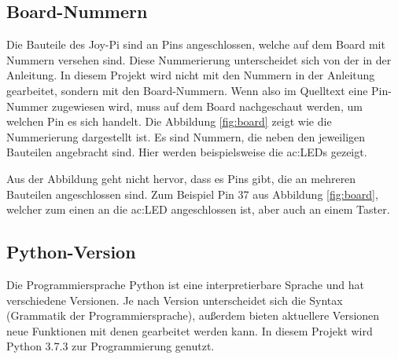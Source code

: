 \subsection{Board-Nummern}
Die Bauteile des Joy-Pi sind an Pins angeschlossen, welche auf dem Board mit Nummern versehen sind. Diese Nummerierung unterscheidet sich von der in der Anleitung. In diesem Projekt wird nicht mit den Nummern in der Anleitung gearbeitet, sondern mit den Board-Nummern. Wenn also im Quelltext eine Pin-Nummer zugewiesen wird, muss auf dem Board nachgeschaut werden, um welchen Pin es sich handelt. Die Abbildung \ref{fig:board} zeigt wie die Nummerierung dargestellt ist. Es sind Nummern, die neben den jeweiligen Bauteilen angebracht sind. Hier werden beispielsweise die \gls{ac:LED}s gezeigt.
\begin{figure}[H] %
\end{figure} %
Aus der Abbildung geht nicht hervor, dass es Pins gibt, die an mehreren Bauteilen angeschlossen sind. Zum Beispiel Pin 37 aus Abbildung \ref{fig:board}, welcher zum einen an die \gls{ac:LED} angeschlossen ist, aber auch an einem Taster.
\subsection{Python-Version}
Die Programmiersprache Python ist eine interpretierbare Sprache und hat verschiedene Versionen. Je nach Version unterscheidet sich die Syntax (Grammatik der Programmiersprache), außerdem bieten aktuellere Versionen neue Funktionen mit denen gearbeitet werden kann. In diesem Projekt wird Python 3.7.3 zur Programmierung genutzt. 

